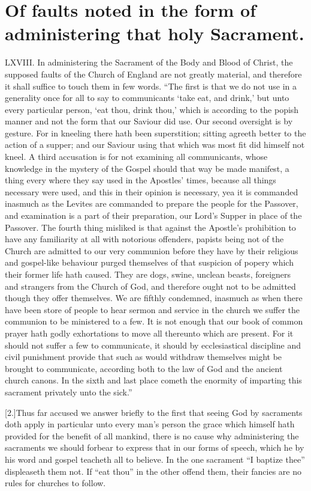 \section*{Of faults noted in the form of administering that holy Sacrament.}
LXVIII. In administering the Sacrament of the Body and Blood of Christ, the supposed faults of the Church of England are not greatly material, and therefore it shall suffice to touch them in few words. “The first is that we do not use in a generality once for all to say to communicants ‘take eat, and drink,’ but unto every particular person, ‘eat thou, drink thou,’ which is according to the popish manner and not the form that our Saviour did use. Our second oversight is by gesture. For in kneeling there hath been superstition; sitting agreeth better to the action of a supper; and our Saviour using that which was most fit did himself not kneel. A third accusation is for not examining all communicants, whose knowledge in the mystery of the Gospel should that way be made manifest, a thing every where they say used in the Apostles’ times, because all things necessary were used,  and this in their opinion is necessary,
 yea it is commanded inasmuch as the Levites are commanded to prepare the people for the Passover, and examination is a part of their preparation, our Lord’s Supper in place of the Passover. The fourth thing misliked is that against the Apostle’s prohibition to have any familiarity at all with notorious offenders, papists being not of the Church are admitted to our very communion before they have by their religious and gospel-like behaviour purged themselves of that suspicion of popery which their former life hath caused. They are dogs, swine, unclean beasts, foreigners and strangers from the Church of God, and therefore ought not to be admitted though they offer themselves. We are fifthly condemned, inasmuch as when there have been store of people to hear sermon and service in the church we suffer the communion to be ministered to a few. It is not enough that our book of common prayer hath godly exhortations to move all thereunto which are present. For it should not suffer a few to communicate, it should by ecclesiastical discipline and civil punishment provide that such as would withdraw themselves might be brought to communicate, according both to the law of God and the ancient church canons. In the sixth and last place cometh the enormity of imparting this sacrament privately unto the sick.”




[2.]Thus far accused we answer briefly to the first that seeing God by sacraments doth apply in particular unto every man’s person the grace which himself hath provided for the benefit of all mankind, there is no cause why administering the sacraments we should forbear to express that in our forms of speech, which he by his word and gospel teacheth all to believe. In the one sacrament “I baptize thee” displeaseth them not. If “eat thou” in the other offend them, their fancies are no rules for churches to follow.

